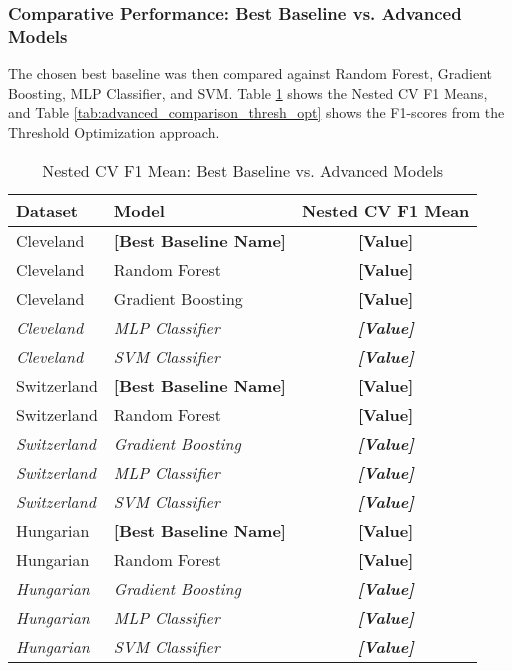 \documentclass{article}
\begin{document}
\subsubsection{Comparative Performance: Best Baseline vs. Advanced Models}
The chosen best baseline was then compared against Random Forest, Gradient Boosting, MLP Classifier, and SVM. Table \ref{tab:advanced_comparison_nested} shows the Nested CV F1 Means, and Table \ref{tab:advanced_comparison_thresh_opt} shows the F1-scores from the Threshold Optimization approach.

\begin{table}[htbp]
\centering
\caption{Nested CV F1 Mean: Best Baseline vs. Advanced Models}
\label{tab:advanced_comparison_nested}
\begin{tabular}{llc}
\toprule
Dataset     & Model                & Nested CV F1 Mean \\
\midrule
Cleveland   & \textbf{[Best Baseline Name]} & \textbf{[Value]}    \\
Cleveland   & Random Forest        & \textbf{[Value]}    \\
Cleveland   & Gradient Boosting    & \textbf{[Value]}    \\
\textit{Cleveland} & \textit{MLP Classifier} & \textit{\textbf{[Value]}}    \\ %
\textit{Cleveland} & \textit{SVM Classifier} & \textit{\textbf{[Value]}}    \\
\midrule
Switzerland & \textbf{[Best Baseline Name]} & \textbf{[Value]}    \\
Switzerland & Random Forest        & \textbf{[Value]}    \\
\textit{Switzerland} & \textit{Gradient Boosting} & \textit{\textbf{[Value]}}    \\
\textit{Switzerland} & \textit{MLP Classifier} & \textit{\textbf{[Value]}}    \\
\textit{Switzerland} & \textit{SVM Classifier} & \textit{\textbf{[Value]}}    \\
\midrule
Hungarian   & \textbf{[Best Baseline Name]} & \textbf{[Value]}    \\
Hungarian   & Random Forest        & \textbf{[Value]}    \\
\textit{Hungarian} & \textit{Gradient Boosting} & \textit{\textbf{[Value]}}    \\
\textit{Hungarian} & \textit{MLP Classifier} & \textit{\textbf{[Value]}}    \\
\textit{Hungarian} & \textit{SVM Classifier} & \textit{\textbf{[Value]}}    \\
\bottomrule
\end{tabular}
\end{table}
\end{document}
